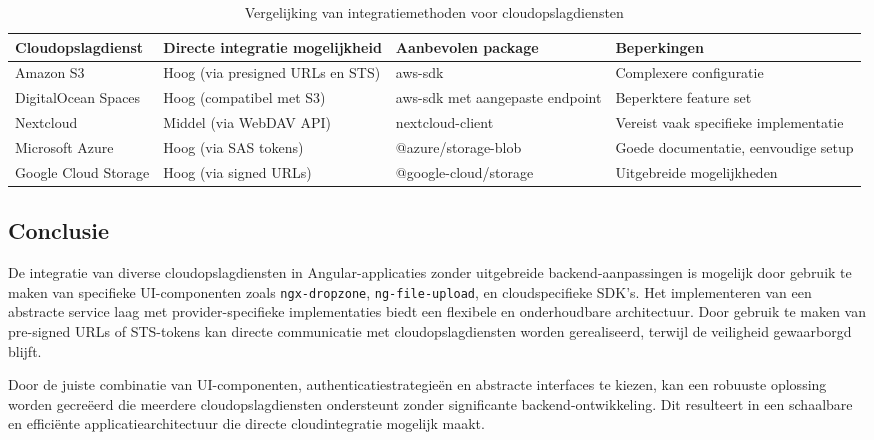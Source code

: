 \begin{table}[h]
\centering
\caption{Vergelijking van integratiemethoden voor cloudopslagdiensten}
\begin{tabular}{|p{3cm}|p{3cm}|p{3cm}|p{3cm}|}
\hline
\textbf{Cloudopslagdienst} & \textbf{Directe integratie mogelijkheid} & \textbf{Aanbevolen package} & \textbf{Beperkingen} \\
\hline
Amazon S3 & Hoog (via presigned URLs en STS) & aws-sdk & Complexere configuratie \\
\hline
DigitalOcean Spaces & Hoog (compatibel met S3) & aws-sdk met aangepaste endpoint & Beperktere feature set \\
\hline
Nextcloud & Middel (via WebDAV API) & nextcloud-client & Vereist vaak specifieke implementatie \\
\hline
Microsoft Azure & Hoog (via SAS tokens) & @azure/storage-blob & Goede documentatie, eenvoudige setup \\
\hline
Google Cloud Storage & Hoog (via signed URLs) & @google-cloud/storage & Uitgebreide mogelijkheden \\
\hline
\end{tabular}
\end{table}

\subsection{Conclusie}

De integratie van diverse cloudopslagdiensten in Angular-applicaties zonder uitgebreide backend-aanpassingen is mogelijk door gebruik te maken van specifieke UI-componenten zoals \texttt{ngx-dropzone}, \texttt{ng-file-upload}, en cloudspecifieke SDK's. Het implementeren van een abstracte service laag met provider-specifieke implementaties biedt een flexibele en onderhoudbare architectuur. Door gebruik te maken van pre-signed URLs of STS-tokens kan directe communicatie met cloudopslagdiensten worden gerealiseerd, terwijl de veiligheid gewaarborgd blijft.

Door de juiste combinatie van UI-componenten, authenticatiestrategieën en abstracte interfaces te kiezen, kan een robuuste oplossing worden gecreëerd die meerdere cloudopslagdiensten ondersteunt zonder significante backend-ontwikkeling. Dit resulteert in een schaalbare en efficiënte applicatiearchitectuur die directe cloudintegratie mogelijk maakt.